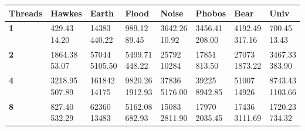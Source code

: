 \documentclass[letterpaper]{article}
\begin{document}
	\begin{center}
	\begin{tabular}{ |m{5em}|m{5em}|m{5em}|m{5em}|m{5em}|m{5em}|m{5em}|m{5em}| }
	\hline
	\textbf{Threads} & \textbf{Hawkes} & \textbf{Earth} & \textbf{Flood} & \textbf{Noise} & \textbf{Phobos} & \textbf{Bear} & \textbf{Univ} \\ \hline
	\textbf{1}& \makecell{429.43 \\[-0.5em] 14.20}& \makecell{14383 \\[-0.5em] 440.22}& \makecell{989.12 \\[-0.5em] 89.45}& \makecell{3642.26 \\[-0.5em] 10.92}& \makecell{3456.41 \\[-0.5em] 208.00}& \makecell{4192.49 \\[-0.5em] 317.16}& \makecell{700.45 \\[-0.5em] 13.43}\\ \hline
	\textbf{2}& \makecell{1864.38 \\[-0.5em] 53.07}& \makecell{57044 \\[-0.5em] 5105.50}& \makecell{5499.71 \\[-0.5em] 448.22}& \makecell{25792 \\[-0.5em] 10284}& \makecell{17851 \\[-0.5em] 813.50}& \makecell{27073 \\[-0.5em] 1873.22}& \makecell{3467.33 \\[-0.5em] 383.90}\\ \hline
	\textbf{4}& \makecell{3218.95 \\[-0.5em] 507.89}& \makecell{161842 \\[-0.5em] 14175}& \makecell{9820.26 \\[-0.5em] 1912.93}& \makecell{37836 \\[-0.5em] 5176.00}& \makecell{39225 \\[-0.5em] 8942.85}& \makecell{51007 \\[-0.5em] 14926}& \makecell{8743.43 \\[-0.5em] 1103.66}\\ \hline
	\textbf{8}& \makecell{827.40 \\[-0.5em] 532.29}& \makecell{62360 \\[-0.5em] 13483}& \makecell{5162.08 \\[-0.5em] 682.93}& \makecell{15083 \\[-0.5em] 2811.90}& \makecell{17970 \\[-0.5em] 2035.45}& \makecell{17436 \\[-0.5em] 3111.69}& \makecell{1720.23 \\[-0.5em] 734.32}\\ \hline
	\end{tabular} \end{center} 
\end{document}
